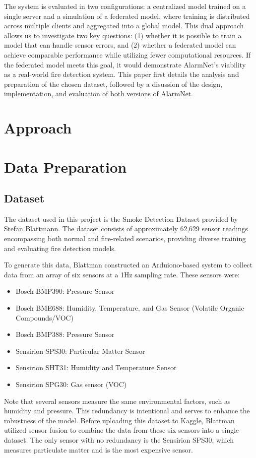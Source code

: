 \documentclass[conference]{IEEEtran}
\begin{document}
The system is evaluated in two configurations: a centralized
model trained on a single server and a simulation of a
federated model, where training is distributed across
multiple clients and aggregated into a global model. This
dual approach allows us to investigate two key questions:
(1) whether it is possible to train a model that can handle
sensor errors, and (2) whether a federated model can achieve
comparable performance while utilizing fewer computational
resources. If the federated model meets this goal, it would
demonstrate AlarmNet's viability as a real-world fire
detection system. This paper first details the analysis and
preparation of the chosen dataset, followed by a disussion
of the design, implementation, and evaluation of both
versions of AlarmNet.

\section{Approach}

\section{Data Preparation}
\subsection{Dataset}
The dataset used in this project is the Smoke Detection
Dataset provided by Stefan Blattmann\cite{dataset}. The
dataset consists of approximately 62,629 sensor readings
encompassing both normal and fire-related scenarios,
providing diverse training and evaluating fire detection
models.

To generate this data, Blattman constructed an
Arduiono-based system to collect data from an array of six
sensors at a 1Hz sampling rate. These sensors were:
\begin{itemize}
    \item Bosch BMP390: Pressure Sensor
    \item Bosch BME688: Humidity, Temperature, and Gas
    Sensor (Volatile Organic Compounds/VOC)
    \item Bosch BMP388: Pressure Sensor
    \item Sensirion SPS30: Particular Matter Sensor
    \item Sensirion SHT31: Humidity and Temperature Sensor
    \item Sensirion SPG30: Gas sensor (VOC)
\end{itemize}
Note that several sensors measure the same environmental
factors, such as humidity and pressure. This redundancy is
intentional and serves to enhance the robustness of the
model. Before uploading this dataset to Kaggle, Blattman
utilized sensor fusion to combine the data from these six
sensors into a single dataset. The only sensor with no
redundancy is the Sensirion SPS30, which measures
particulate matter and is the most expensive sensor.
\end{document}
